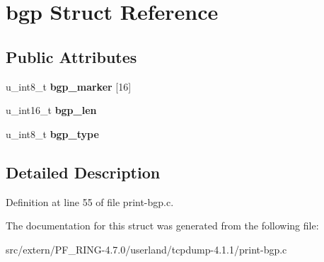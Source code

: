 \hypertarget{structbgp}{
\section{bgp Struct Reference}
\label{structbgp}
}
\subsection*{Public Attributes}
\begin{DoxyCompactItemize}
\item 
\hypertarget{structbgp_a5e010988c28ba3bedfcd5c902d230f67}{
u\_\-int8\_\-t {\bfseries bgp\_\-marker} \mbox{[}16\mbox{]}}
\label{structbgp_a5e010988c28ba3bedfcd5c902d230f67}

\item 
\hypertarget{structbgp_ae5eeb6e3661af19a0b2d57230c3589d7}{
u\_\-int16\_\-t {\bfseries bgp\_\-len}}
\label{structbgp_ae5eeb6e3661af19a0b2d57230c3589d7}

\item 
\hypertarget{structbgp_ae4246487580f82440b9f4e8061ec9ae3}{
u\_\-int8\_\-t {\bfseries bgp\_\-type}}
\label{structbgp_ae4246487580f82440b9f4e8061ec9ae3}

\end{DoxyCompactItemize}


\subsection{Detailed Description}


Definition at line 55 of file print-\/bgp.c.



The documentation for this struct was generated from the following file:\begin{DoxyCompactItemize}
\item 
src/extern/PF\_\-RING-\/4.7.0/userland/tcpdump-\/4.1.1/print-\/bgp.c\end{DoxyCompactItemize}
